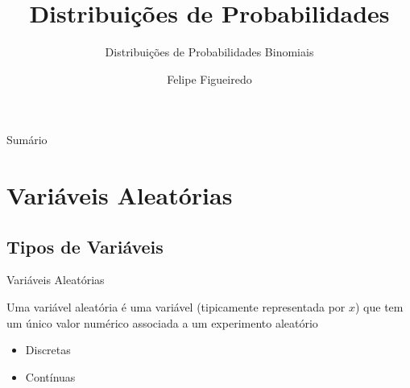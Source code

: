 \documentclass{beamer}
\title%
{Distribuições de Probabilidades}
\subtitle
{Distribuições de Probabilidades Binomiais} %
\author%
{Felipe Figueiredo}%
\institute[UNIAN] %
{Centro Universitário Anhanguera de Niterói}
\date%
{}
\begin{document}
\begin{frame}
  \titlepage
\end{frame}

\begin{frame}{Sumário}
  \tableofcontents
\end{frame}







\section{Variáveis Aleatórias}

\subsection{Tipos de Variáveis}
\begin{frame}{Variáveis Aleatórias}
\begin{definition}
  Uma \alert{variável aleatória} é uma variável (tipicamente
  representada por $x$) que tem um único valor numérico associada a um
  experimento aleatório
\end{definition}
\begin{itemize}
\item Discretas%
\item Contínuas%
\end{itemize}
\end{frame}
\end{document}
